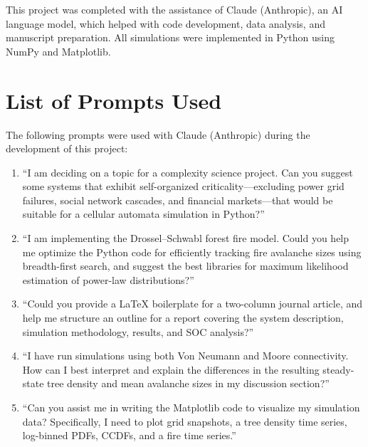 \documentclass[12pt, a4paper, twocolumn]{article}
\begin{document}
This project was completed with the assistance of Claude (Anthropic), an AI language model, which helped with code development, data analysis, and manuscript preparation.
All simulations were implemented in Python using NumPy and Matplotlib.

\section*{List of Prompts Used}

The following prompts were used with Claude (Anthropic) during the development of this project:

\begin{enumerate}[leftmargin=*, label=\arabic*.]
    \item ``I am deciding on a topic for a complexity science project. Can you suggest some systems that exhibit self-organized criticality—excluding power grid failures, social network cascades, and financial markets—that would be suitable for a cellular automata simulation in Python?''
    \item ``I am implementing the Drossel--Schwabl forest fire model. Could you help me optimize the Python code for efficiently tracking fire avalanche sizes using breadth-first search, and suggest the best libraries for maximum likelihood estimation of power-law distributions?''
    \item ``Could you provide a LaTeX boilerplate for a two-column journal article, and help me structure an outline for a report covering the system description, simulation methodology, results, and SOC analysis?''
    \item ``I have run simulations using both Von Neumann and Moore connectivity. How can I best interpret and explain the differences in the resulting steady-state tree density and mean avalanche sizes in my discussion section?''
    \item ``Can you assist me in writing the Matplotlib code to visualize my simulation data? Specifically, I need to plot grid snapshots, a tree density time series, log-binned PDFs, CCDFs, and a fire time series.''
\end{enumerate}
\end{document}

